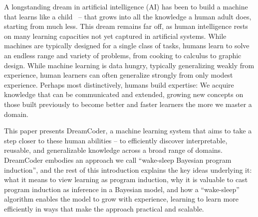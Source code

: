 \documentclass[12pt]{article}
\begin{document}
A longstanding dream in artificial intelligence (AI) has been to build a machine that learns like a child~\cite{turing50} -- that grows into all the knowledge a human adult does, starting from much less.
This dream remains far off, as human intelligence rests on many learning capacities not yet captured in artificial systems.
While machines %
are typically designed for a single class of tasks, humans %
learn to solve an endless range and variety of problems, from cooking to calculus to graphic design. %
While machine learning is data hungry, typically generalizing weakly from experience, human learners can often generalize strongly from only modest %
experience. %
Perhaps most distinctively, %
humans build expertise: 
We acquire knowledge that can be communicated and extended, 
growing new concepts on those built previously to become better and faster learners the more we master a domain.
%
%
%
%

This paper presents DreamCoder, a machine learning system that aims to take a step closer to these human abilities -- to efficiently discover interpretable, reusable, and generalizable knowledge across a broad range of domains.  DreamCoder embodies an approach we call ``wake-sleep Bayesian program induction'', and the rest of this introduction explains the key ideas underlying it: what it means to view learning as program induction, why it is valuable to cast program induction as inference in a %
Bayesian model, and how a ``wake-sleep'' algorithm enables the model to grow with experience, learning to learn more efficiently in ways that make the approach practical and scalable. 
\end{document}
